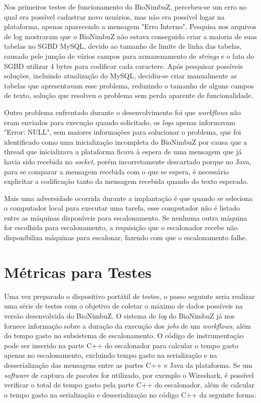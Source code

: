 Nos primeiros testes de funcionamento do BioNimbuZ, percebeu-se um erro no qual era possível cadastrar novo usuários, mas não era possível logar na plataforma, apenas aparecendo a mensagem "Erro Interno". Pesquisa nos arquivos de log mostraram que o BioNimbuZ não estava conseguido criar a maioria de suas tabelas no \acrfull{SGBD} MySQL, devido ao tamanho de limite de linha das tabelas, causado pele junção de vários campos para armazenamento de \textit{strings} e o fato do \acrshort{SGBD} utilizar 4 bytes para codificar cada caractere. Após pesquisar possíveis soluções, incluindo atualização do MySQL, decidiu-se criar manualmente as tabelas que apresentavam esse problema, reduzindo o tamanho de alguns campos de texto, solução que resolveu o problema sem perda aparente de funcionalidade.

Outro problema enfrentado durante o desenvolvimento foi que \textit{workflows} não eram enviados para execução quando solicitado, os \textit{logs} apenas informavam "Error: NULL", sem maiores informações para solucionar o problema, que foi identificado como uma inicialização incompleta do BioNimbuZ por causa que a thread que inicializava a plataforma ficava à espera de uma mensagem que já havia sido recebida no \textit{socket}, porém incorretamente descartado porque no Java, para se comparar a mensagem recebida com o que se espera, é necessário explicitar a codificação tanto da mensagem recebida quando do texto esperado.

Mais uma adversidade ocorrida durante a implantação é que quando se seleciona o computador local para executar uma tarefa, esse computador não é listado entre as máquinas disponíveis para escalonamento. Se nenhuma outra máquina for escolhida para escalonamento, a requisição que o escalonador recebe não disponibiliza máquinas para escalonar, fazendo com que o escalonamento falhe.

\section{Métricas para Testes}

Uma vez preparado o dispositivo portátil de testes, o passo seguinte seria realizar uma série de testes com o objetivo de coletar o máximo de dados possíveis na versão desenvolvida do BioNimbuZ. O sistema de \textit{log} do BioNimbuZ já nos fornece informação sobre a duração da execução dos \textit{jobs} de um \textit{workflows}, além do tempo gasto no subsistema de escalonamento. O código de instrumentação pode ser inserido na parte C++ do escalonador para calcular o tempo gasto apenas no escalonamento, excluindo tempo gasto na serialização e na desserialização das mensagens entre as partes C++ e Java da plataforma. Se um \textit{software} de captura de pacotes for utilizado, por exemplo o Wireshark\cite{Wireshark}, é possível verificar o total de tempo gasto pela parte C++ do escalonador, além de calcular o tempo gasto na serialização e desserialização no código C++ da seguinte forma:

